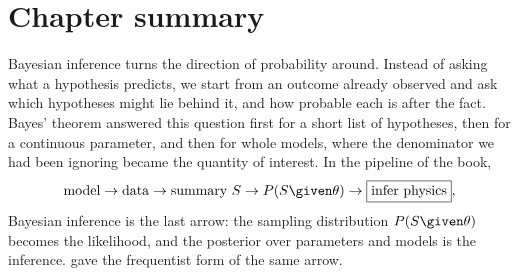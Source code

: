 \clearpage
\raggedbottom
\section*{Chapter summary}
\label{5c:sec:summary}

Bayesian inference turns the direction of probability around. Instead of asking what a
hypothesis predicts, we start from an outcome already observed and ask which hypotheses
might lie behind it, and how probable each is after the fact. Bayes' theorem answered
this question first for a short list of hypotheses, then for a continuous parameter,
and then for whole models, where the denominator we had been ignoring became the
quantity of interest. In the pipeline of the book,
\[
  \text{model}\to\text{data}\to\text{summary }S\to P(S\given\theta)\to\boxed{\text{infer physics}},
\]
Bayesian inference is the last arrow: the sampling distribution $P(S\given\theta)$ becomes
the likelihood, and the posterior over parameters and models is the inference.
 gave the frequentist form of the same arrow.

